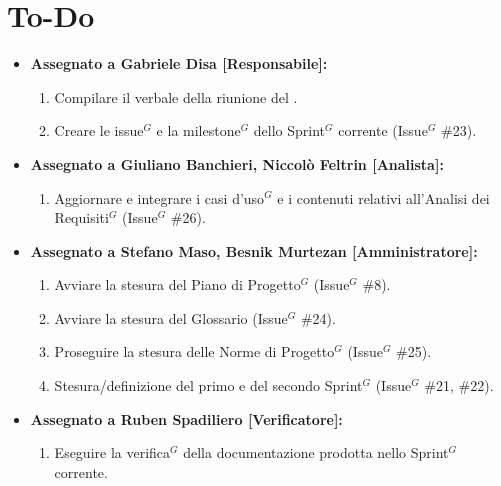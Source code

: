\documentclass[a4paper,10pt]{article}
\begin{document}
\vspace{0.5cm}

\newpage

\section*{To-Do}
\begin{itemize}
  \item \textbf{Assegnato a Gabriele Disa [Responsabile]:}
  \begin{enumerate}
    \item Compilare il verbale della riunione del .
    \item Creare le issue$^G$ e la milestone$^G$ dello Sprint$^G$ corrente (Issue$^G$ \#23).
  \end{enumerate}

  \item \textbf{Assegnato a Giuliano Banchieri, Niccolò Feltrin [Analista]:}
  \begin{enumerate}
    \item Aggiornare e integrare i casi d'uso$^G$ e i contenuti relativi all'Analisi dei Requisiti$^G$ (Issue$^G$ \#26).
  \end{enumerate}

  \item \textbf{Assegnato a Stefano Maso, Besnik Murtezan [Amministratore]:}
  \begin{enumerate}
    \item Avviare la stesura del Piano di Progetto$^G$ (Issue$^G$ \#8).
    \item Avviare la stesura del Glossario (Issue$^G$ \#24).
    \item Proseguire la stesura delle Norme di Progetto$^G$ (Issue$^G$ \#25).
    \item Stesura/definizione del primo e del secondo Sprint$^G$ (Issue$^G$ \#21, \#22).
  \end{enumerate}

  \item \textbf{Assegnato a Ruben Spadiliero [Verificatore]:}
  \begin{enumerate}
    \item Eseguire la verifica$^G$ della documentazione prodotta nello Sprint$^G$ corrente.
  \end{enumerate}
\end{itemize}
\end{document}
